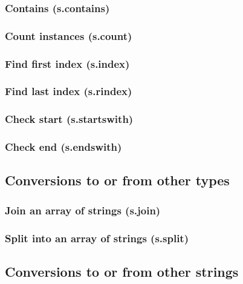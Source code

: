 \documentclass{article}
\theoremstyle{definition}
\begin{document}
\subsubsection{Contains (s.contains)}

\subsubsection{Count instances (s.count)}

\subsubsection{Find first index (s.index)}

\subsubsection{Find last index (s.rindex)}

\subsubsection{Check start (s.startswith)}

\subsubsection{Check end (s.endswith)}

\subsection{Conversions to or from other types}

\subsubsection{Join an array of strings (s.join)}

\subsubsection{Split into an array of strings (s.split)}

\subsection{Conversions to or from other strings}
\end{document}

